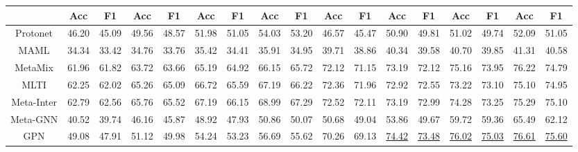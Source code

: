 \begin{table*}[ht]
{\begin{tabular}{@{}c|cccccccc|cccccccc@{}}
                       & Acc            & F1             & Acc            & F1             & Acc            & F1             & Acc            & F1             & Acc            & F1             & Acc            & F1             & Acc            & F1             & Acc            & F1             \\ \midrule
Protonet               & 46.20          & 45.09          & 49.56          & 48.57          & 51.98          & 51.05          & 54.03          & 53.20          & 46.57          & 45.47          & 50.90          & 49.81          & 51.02          & 49.74          & 52.09          & 51.05          \\
MAML                   & 34.34          & 33.42          & 34.76          & 33.76          & 35.42          & 34.41          & 35.91          & 34.95          & 39.71          & 38.86          & 40.34          & 39.58          & 40.70           & 39.85          & 41.31          & 40.58          \\ \midrule
MetaMix                   & 61.96          & 61.82          & 63.72          & 63.66          & 65.19          & 64.92          & 66.15          & 65.72          & 72.12          & 71.15          & 73.19          & 72.12          & 75.16          & 73.95          & 76.22          & 74.79          \\
MLTI                   & 62.25          & 62.02          & 65.26          & 65.09          & 66.72          & 65.59          & 67.19          & 66.22          & 72.36          & 71.96          & 72.92          & 72.55          & 73.22          & 73.10          & 75.10          & 74.95          \\
Meta-Inter                   & 62.79          & 62.56          & 65.76          & 65.52          & 67.19          & 66.15          & 68.99          & 67.29          & 72.52          & 72.11          & 73.19          & 72.99          & 74.28          & 73.25          & 75.29          & 75.10          \\ \midrule
Meta-GNN               & 40.52          & 39.74          & 46.16          & 45.87          & 48.92          & 47.93          & 50.86          & 50.07          & 50.68          & 49.04          & 53.86          & 49.67          & 59.72          & 59.36          & 65.49          & 62.12          \\
GPN                    & 49.08          & 47.91          & 51.12          & 49.98          & 54.24          & 53.23          & 56.69          & 55.62          & 70.26    & 69.13    & \underline{74.42}    & \underline{73.48}    & \underline{76.02}          & \underline{75.03}          & \underline{76.61}          & \underline{75.60}          \\

\end{tabular}}
\end{table*}

